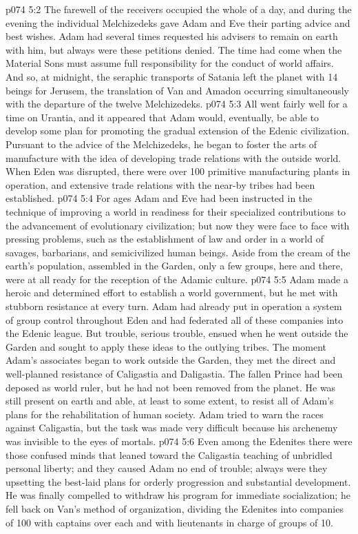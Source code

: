 \vs p074 5:2 The farewell of the receivers occupied the whole of a day, and during the evening the individual Melchizedeks gave Adam and Eve their parting advice and best wishes. Adam had several times requested his advisers to remain on earth with him, but always were these petitions denied. The time had come when the Material Sons must assume full responsibility for the conduct of world affairs. And so, at midnight, the seraphic transports of Satania left the planet with 14 beings for Jerusem, the translation of Van and Amadon occurring simultaneously with the departure of the twelve Melchizedeks.
\vs p074 5:3 \pc All went fairly well for a time on Urantia, and it appeared that Adam would, eventually, be able to develop some plan for promoting the gradual extension of the Edenic civilization. Pursuant to the advice of the Melchizedeks, he began to foster the arts of manufacture with the idea of developing trade relations with the outside world. When Eden was disrupted, there were over 100 primitive manufacturing plants in operation, and extensive trade relations with the near\hyp{}by tribes had been established.
\vs p074 5:4 For ages Adam and Eve had been instructed in the technique of improving a world in readiness for their specialized contributions to the advancement of evolutionary civilization; but now they were face to face with pressing problems, such as the establishment of law and order in a world of savages, barbarians, and semicivilized human beings. Aside from the cream of the earth’s population, assembled in the Garden, only a few groups, here and there, were at all ready for the reception of the Adamic culture.
\vs p074 5:5 Adam made a heroic and determined effort to establish a world government, but he met with stubborn resistance at every turn. Adam had already put in operation a system of group control throughout Eden and had federated all of these companies into the Edenic league. But trouble, serious trouble, ensued when he went outside the Garden and sought to apply these ideas to the outlying tribes. The moment Adam’s associates began to work outside the Garden, they met the direct and well\hyp{}planned resistance of Caligastia and Daligastia. The fallen Prince had been deposed as world ruler, but he had not been removed from the planet. He was still present on earth and able, at least to some extent, to resist all of Adam’s plans for the rehabilitation of human society. Adam tried to warn the races against Caligastia, but the task was made very difficult because his archenemy was invisible to the eyes of mortals.
\vs p074 5:6 Even among the Edenites there were those confused minds that leaned toward the Caligastia teaching of unbridled personal liberty; and they caused Adam no end of trouble; always were they upsetting the best\hyp{}laid plans for orderly progression and substantial development. He was finally compelled to withdraw his program for immediate socialization; he fell back on Van’s method of organization, dividing the Edenites into companies of 100 with captains over each and with lieutenants in charge of groups of 10.
